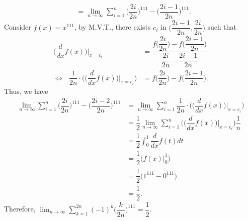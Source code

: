 \documentclass{article}
\begin{document}
\begin{enumerate}[(1)]
\begin{align*}
        &=\lim_{n\to\infty}{\sum_{i=1}^{n}{\Big(\dfrac{2i}{2n}\Big)^{111}-\Big(\dfrac{2i-1}{2n}\Big)^{111}}}.
    \end{align*}
    Consider $f(x)=x^{111}$, by M.V.T., there exists $c_i$ in $\Big(\dfrac{2i-1}{2n}, \dfrac{2i}{2n}\Big)$ such that
    \begin{align*}
        \Big(\dfrac{d}{dx}f(x)\Big)\Big|_{x=c_i}&=\dfrac{f\Big(\dfrac{2i}{2n}\Big)-f\Big(\dfrac{2i-1}{2n}\Big)}{\dfrac{2i}{2n}-\dfrac{2i-1}{2n}}\\
        \Leftrightarrow\:\:\:\dfrac{1}{2n}\cdot\Big(\Big(\dfrac{d}{dx}f(x)\Big)\Big|_{x=c_i}\Big)&=f\Big(\dfrac{2i}{2n}\Big)-f\Big(\dfrac{2i-1}{2n}\Big).
    \end{align*}
    Thus, we have
    \begin{align*}
        \lim_{n\to\infty}{\sum_{i=1}^{n}{\Big(\dfrac{2i}{2n}\Big)^{111}-\Big(\dfrac{2i-2}{2n}\Big)^{111}}}&=\lim_{n\to\infty}{\sum_{i=1}^{n}{\dfrac{1}{2n}\cdot\Big(\Big(\dfrac{d}{dx}f(x)\Big)\Big|_{x=c_i}\Big)}}\\
        &=\dfrac{1}{2}\lim_{n\to\infty}{\sum_{i=1}^{n}{\Big(\Big(\dfrac{d}{dx}f(x)\Big)\Big|_{x=c_i}\Big)\dfrac{1}{n}}}\\
        &=\dfrac{1}{2}\int_0^1{\dfrac{d}{dx}f(t)dt}\\
        &=\dfrac{1}{2}\Big(f(x)\Big|^1_0\Big)\\
        &=\dfrac{1}{2}\big(1^{111}-0^{111}\big)\\
        &=\dfrac{1}{2}.
    \end{align*}
    Therefore, $\displaystyle\lim_{n\to\infty}{\sum_{k=1}^{2n}{(-1)^k\Big(\dfrac{k}{2n}\Big)^{111}}}=\dfrac{1}{2}$.
\end{enumerate}
\end{document}
